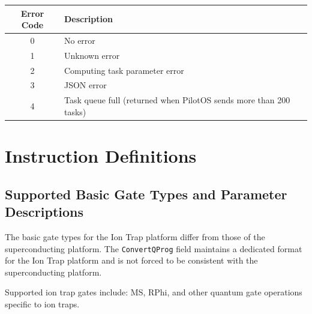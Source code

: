\documentclass[12pt, a4paper]{article}
\begin{document}
\begin{longtable}{|c|p{12cm}|}
\hline
\textbf{Error Code} & \textbf{Description} \\ \hline
\endhead
0 & No error \\ \hline
1 & Unknown error \\ \hline
2 & Computing task parameter error \\ \hline
3 & JSON error \\ \hline
4 & Task queue full (returned when PilotOS sends more than 200 tasks) \\ \hline
\end{longtable}

\section{Instruction Definitions}

\subsection{Supported Basic Gate Types and Parameter Descriptions}

The basic gate types for the Ion Trap platform differ from those of the superconducting platform. The \texttt{ConvertQProg} field maintains a dedicated format for the Ion Trap platform and is not forced to be consistent with the superconducting platform.

Supported ion trap gates include: MS, RPhi, and other quantum gate operations specific to ion traps.
\end{document}

